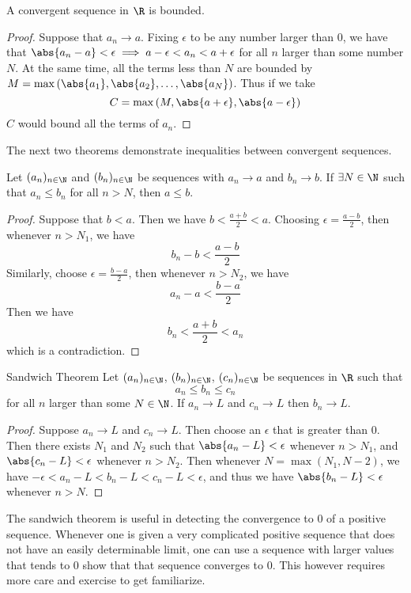 \begin{prp}{}{} A convergent sequence in $\R$ is bounded. \tcbline
\begin{proof} Suppose that $a_n\to a$. Fixing $\epsilon$ to be any number larger than 0, we have that $\abs{a_n-a}<\epsilon\implies a-\epsilon<a_n<a+\epsilon$ for all $n$ larger than some number $N$. At the same time, all the terms less than $N$ are bounded by $M=\max{(\abs{a_1}, \abs{a_2}, \dots,\abs{a_N})}$. Thus if we take $$C=\max{(M,\abs{a+\epsilon},\abs{a-\epsilon})}$$ $C$ would bound all the terms of $a_n$. 
\end{proof}
\end{prp}

The next two theorems demonstrate inequalities between convergent sequences. 

\begin{thm}{}{} Let $(a_n)_{n\in\N}$ and $(b_n)_{n\in\N}$ be sequences with $a_n\to a$ and $b_n\to b$. If $\exists N\in\N$ such that $a_n\leq b_n$ for all $n>N$, then $a\leq b$. \tcbline
\begin{proof} Suppose that $b<a$. Then we have $b<\frac{a+b}{2}<a$. Choosing $\epsilon=\frac{a-b}{2}$, then whenever $n>N_1$, we have $$b_n-b<\frac{a-b}{2}$$ Similarly, choose $\epsilon=\frac{b-a}{2}$, then whenever $n>N_2$, we have $$a_n-a<\frac{b-a}{2}$$ Then we have $$b_n<\frac{a+b}{2}<a_n$$ which is a contradiction. 
\end{proof}
\end{thm}

\begin{thm}{Sandwich Theorem}{} Let $(a_n)_{n\in\N}$, $(b_n)_{n\in\N}$, $(c_n)_{n\in\N}$ be sequences in $\R$ such that $$a_n\leq b_n\leq c_n$$ for all $n$ larger than some $N\in\N$. If $a_n\to L$ and $c_n\to L$ then $b_n\to L$. \tcbline
\begin{proof} Suppose $a_n\to L$ and $c_n\to L$. Then choose an $\epsilon$ that is greater than $0$. Then there exists $N_1$ and $N_2$ such that $\abs{a_n-L}<\epsilon$ whenever $n>N_1$, and $\abs{c_n-L}<\epsilon$ whenever $n>N_2$. Then whenever $N=\max{(N_1,N-2)}$, we have $-\epsilon<a_n-L<b_n-L<c_n-L<\epsilon$, and thus we have $\abs{b_n-L}<\epsilon$ whenever $n>N$. 
\end{proof}
\end{thm}

The sandwich theorem is useful in detecting the convergence to $0$ of a positive sequence. Whenever one is given a very complicated positive sequence that does not have an easily determinable limit, one can use a sequence with larger values that tends to $0$ show that that sequence converges to $0$. This however requires more care and exercise to get familiarize. \\~\\

